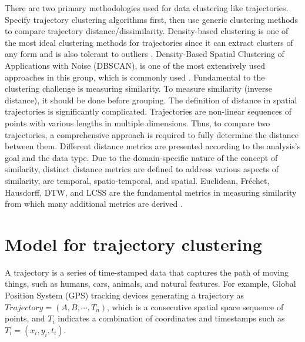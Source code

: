 \documentclass[a4paper, 12pt]{article}
\begin{document}
There are two primary methodologies used for data clustering like trajectories. Specify trajectory clustering algorithms first, then use generic clustering methods to compare trajectory distance/dissimilarity. Density-based clustering \citep{kriegel2011density} is one of the most ideal clustering methods for trajectories since it can extract clusters of any form and is also tolerant to outliers \citep{ester1996density}. Density-Based Spatial Clustering of Applications with Noise (DBSCAN), is one of the most extensively used approaches in this group, which is commonly used \citep{zhao2019trajectory, cheng2018density, chen2011clustering, lee2007trajectory}. Fundamental to the clustering challenge is measuring similarity. To measure similarity (inverse distance), it should be done before grouping. The definition of distance in spatial trajectories is significantly complicated. Trajectories are non-linear sequences of points with various lengths in multiple dimensions. Thus, to compare two trajectories, a comprehensive approach is required to fully determine the distance between them. Different distance metrics are presented according to the analysis's goal and the data type. Due to the domain-specific nature of the concept of similarity, distinct distance metrics are defined to address various aspects of similarity, are temporal, spatio-temporal, and spatial. Euclidean, Fréchet, Hausdorff, DTW, and LCSS are the fundamental metrics in measuring similarity from which many additional metrics are derived \citep{abbaspour2017method, aghabozorgi2015time, wang2013effectiveness}.

\section{Model for trajectory clustering}
A trajectory is a series of time-stamped data that captures the path of moving things, such as humans, cars, animals, and natural features. For example, Global Position System (GPS) tracking devices generating a trajectory as $Trajectory=(A,B,\cdots,T_{n})$, which is a consecutive spatial space sequence of points, and $T_{i}$ indicates a combination of coordinates and timestamps such as $T_i=(x_{i},y_{i},t_{i})$.
\end{document}
